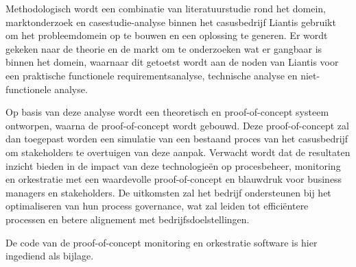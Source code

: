\documentclass[dutch,dit,thesis]{hogentreport}
\begin{document}
Methodologisch wordt een combinatie van literatuurstudie rond het domein, marktonderzoek en casestudie-analyse binnen het casusbedrijf Liantis gebruikt om het probleemdomein op te bouwen en een oplossing te generen. Er wordt gekeken naar de theorie en de markt om te onderzoeken wat er gangbaar is binnen het domein, waarnaar dit getoetst wordt aan de noden van Liantis voor een praktische functionele requirementsanalyse, technische analyse en niet-functionele analyse. \newline

Op basis van deze analyse wordt een theoretisch en proof-of-concept systeem ontworpen, waarna de proof-of-concept wordt gebouwd. Deze proof-of-concept zal dan toegepast worden een simulatie van een bestaand proces van het casusbedrijf om stakeholders te overtuigen van deze aanpak. Verwacht wordt dat de resultaten inzicht bieden in de impact van deze technologieën op procesbeheer, monitoring en orkestratie met een waardevolle proof-of-concept en blauwdruk voor business managers en stakeholders. De uitkomsten zal het bedrijf ondersteunen bij het optimaliseren van hun process governance, wat zal leiden tot efficiëntere processen en betere alignement met bedrijfsdoelstellingen.



%

De code van de proof-of-concept monitoring en orkestratie software is hier ingediend als bijlage.



\backmatter{}

\setlength\bibitemsep{2pt} %
\printbibliography[heading=bibintoc]
\end{document}
